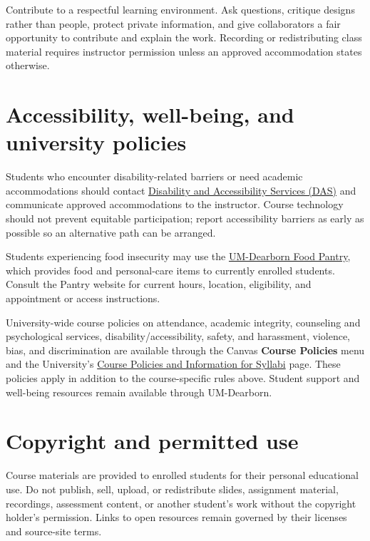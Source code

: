 \documentclass[10pt,letterpaper]{article}
\begin{document}
Contribute to a respectful learning environment. Ask questions, critique designs rather than people, protect private information, and give collaborators a fair opportunity to contribute and explain the work. Recording or redistributing class material requires instructor permission unless an approved accommodation states otherwise.

\section{Accessibility, well-being, and university policies}

Students who encounter disability-related barriers or need academic accommodations should contact \href{https://umdearborn.edu/disability-and-accessibility-services}{Disability and Accessibility Services (DAS)} and communicate approved accommodations to the instructor. Course technology should not prevent equitable participation; report accessibility barriers as early as possible so an alternative path can be arranged.

Students experiencing food insecurity may use the \href{https://umdearborn.edu/food-pantry}{UM-Dearborn Food Pantry}, which provides food and personal-care items to currently enrolled students. Consult the Pantry website for current hours, location, eligibility, and appointment or access instructions.

University-wide course policies on attendance, academic integrity, counseling and psychological services, disability/accessibility, safety, and harassment, violence, bias, and discrimination are available through the Canvas \textbf{Course Policies} menu and the University's \href{https://umdearborn.edu/policies-and-procedures/academic-policies-and-procedures/course-policies-and-information-syllabi}{Course Policies and Information for Syllabi} page. These policies apply in addition to the course-specific rules above. Student support and well-being resources remain available through UM-Dearborn.

\section{Copyright and permitted use}

Course materials are provided to enrolled students for their personal educational use. Do not publish, sell, upload, or redistribute slides, assignment material, recordings, assessment content, or another student's work without the copyright holder's permission. Links to open resources remain governed by their licenses and source-site terms.
\end{document}
